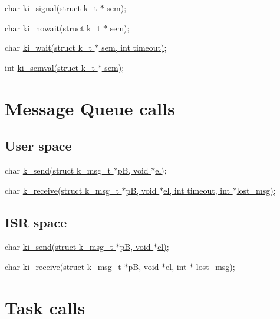 \begin{DoxyItemize}
\item char \hyperlink{krnl_8h_a45c4a121f17683f0cd3593c0ee0bff1b}{ki\+\_\+signal(struct k\+\_\+t $\ast$ sem)};
\item char ki\+\_\+nowait(struct k\+\_\+t $\ast$ sem);
\item char \hyperlink{krnl_8h_aead12f2e7f6ee98b98bb847c42d5027c}{ki\+\_\+wait(struct k\+\_\+t $\ast$ sem, int timeout)};
\item int \hyperlink{krnl_8h_a306bc3e4b53fc2f608e5945f20cf9ea5}{ki\+\_\+semval(struct k\+\_\+t $\ast$ sem)};
\end{DoxyItemize}\hypertarget{index_a61}{}\section{Message Queue calls}\label{index_a61}
\hypertarget{index_a611}{}\subsection{User space}\label{index_a611}

\begin{DoxyItemize}
\item char \hyperlink{krnl_8h_aad1cd26ac0560fb40b088b229c07f7a3}{k\+\_\+send(struct k\+\_\+msg\+\_\+t $\ast$p\+B, void $\ast$el)};
\item char \hyperlink{krnl_8h_a3e7f34b848366b08928c72711b6c008a}{k\+\_\+receive(struct k\+\_\+msg\+\_\+t $\ast$p\+B, void $\ast$el, int timeout, int $\ast$lost\+\_\+msg)};
\end{DoxyItemize}\hypertarget{index_a612}{}\subsection{I\+S\+R space}\label{index_a612}

\begin{DoxyItemize}
\item char \hyperlink{krnl_8h_a7f0e5da0dbd3154fa3b69e3e2e650bed}{ki\+\_\+send(struct k\+\_\+msg\+\_\+t $\ast$p\+B, void $\ast$el)};
\item char \hyperlink{krnl_8h_a66c23bd6aa71c0d083e4a4b71b35ff71}{ki\+\_\+receive(struct k\+\_\+msg\+\_\+t $\ast$p\+B, void $\ast$el, int $\ast$ lost\+\_\+msg)};
\end{DoxyItemize}\hypertarget{index_a8}{}\section{Task calls}\label{index_a8}

